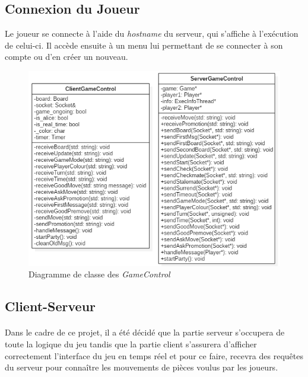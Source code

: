 \documentclass[10pt, a4paper]{article}
\begin{document}
\newpage

\subsection{Connexion du Joueur}
Le joueur se connecte à l'aide du \textit{hostname} du serveur, qui s'affiche à l'exécution de celui-ci. Il accède ensuite à un menu lui permettant de se connecter à son compte ou d'en créer un nouveau.

\begin{figure}[H]
\centering
\includegraphics[scale=0.72]{client_server_control.png}
\caption{Diagramme de classe des \textit{GameControl}}
\end{figure}

\subsection{Client-Serveur}
\paragraph{}Dans le cadre de ce projet, il a été décidé que la partie serveur s'occupera de toute la logique du jeu tandis que la partie client s'assurera d'afficher correctement l'interface du jeu en temps réel et pour ce faire, recevra des requêtes du serveur pour connaître les mouvements de pièces voulus par les joueurs.
\end{document}
